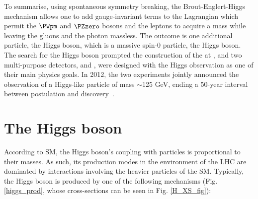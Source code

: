 To summarise, using spontaneous symmetry breaking, the Brout-Englert-Higgs mechanism allows one to add gauge-invariant terms to the \SM Lagrangian which permit the $\PWpm$ and $\PZzero$ bosons and the leptons to acquire a mass while leaving the gluons and the photon massless. The outcome is one additional particle, the Higgs boson, which is a massive spin-0 particle, the Higgs boson. The search for the Higgs boson prompted the construction of the \LHC at \CERN, and two multi-purpose detectors, \ATLAS and \CMS, were designed with the Higgs observation as one of their main physics goals. In 2012, the two experiments jointly announced the observation of a Higgs-like particle of mass $\sim$125 GeV, ending a 50-year interval between postulation and discovery~\cite{CMSHDisc,ATLASHDisc}.

 
\section{The Higgs boson}
According to SM, the Higgs boson's coupling with particles is proportional to their masses. As such, its production modes in the environment of the LHC are dominated by interactions involving the heavier particles of the SM. Typically, the Higgs boson is produced by one of the following mechanisms (Fig. \ref{higgs_prod}, whose cross-sections can be seen in Fig. \ref{H_XS_fig}):

